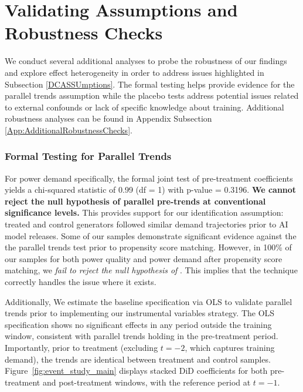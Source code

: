 \documentclass[a4paper,fleqn,longmktitle]{cas-sc}
\newcommand{\nb}[1]{\textcolor{blue}{NB[#1]}}
\begin{document}
\section{Validating Assumptions and Robustness Checks}\label{Robustness}
We conduct several additional analyses to probe the robustness of our findings and explore effect heterogeneity in order to address issues highlighted in Subsection \ref{DCASSUmptions}. The formal testing helps provide evidence for the parallel trends assumption while the placebo tests address potential issues related to external confounds or lack of specific knowledge about training. Additional robustness analyses can be found in Appendix Subsection \ref{App:AdditionalRobustnessChecks}.

\subsubsection{Formal Testing for Parallel Trends}

 For power demand specifically, the formal joint test of pre-treatment coefficients yields a chi-squared statistic of 0.99 (df = 1) with p-value = 0.3196. \textbf{We cannot reject the null hypothesis of parallel pre-trends at conventional significance levels.} This provides support for our identification assumption: treated and control generators followed similar demand trajectories prior to AI model releases. Some of our samples demonstrate significant evidence against the the parallel trends test prior to propensity score matching. However, in 100\% of our samples for both power quality and power demand after propensity score matching, we \textit{fail to reject the null hypothesis of }. This implies that the technique correctly handles the issue where it exists. 
 
 Additionally, We estimate the baseline specification via OLS to validate parallel trends prior to implementing our instrumental variables strategy. The OLS specification shows no significant effects in any period outside the training window, consistent with parallel trends holding in the pre-treatment period. Importantly, prior to treatment (excluding $t=-2$, which captures training demand), the trends are identical between treatment and control samples. Figure~\ref{fig:event_study_main} displays stacked DiD coefficients for both pre-treatment and post-treatment windows, with the reference period at $t=-1$.
\end{document}
